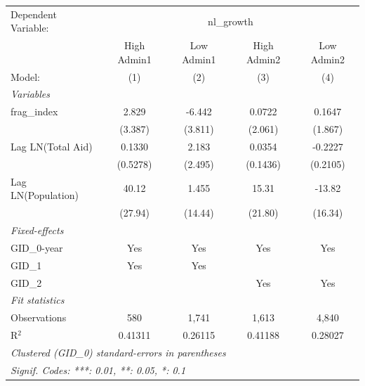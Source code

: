 
\begingroup
\centering
\begin{tabular}{lcccc}
   \tabularnewline \midrule \midrule
   Dependent Variable: & \multicolumn{4}{c}{nl\_growth}\\
                      & High Admin1 & Low Admin1 & High Admin2 & Low Admin2 \\   
   Model:             & (1)         & (2)        & (3)         & (4)\\  
   \midrule
   \emph{Variables}\\
   frag\_index        & 2.829       & -6.442     & 0.0722      & 0.1647\\   
                      & (3.387)     & (3.811)    & (2.061)     & (1.867)\\   
   Lag LN(Total Aid)  & 0.1330      & 2.183      & 0.0354      & -0.2227\\   
                      & (0.5278)    & (2.495)    & (0.1436)    & (0.2105)\\   
   Lag LN(Population) & 40.12       & 1.455      & 15.31       & -13.82\\   
                      & (27.94)     & (14.44)    & (21.80)     & (16.34)\\   
   \midrule
   \emph{Fixed-effects}\\
   GID\_0-year        & Yes         & Yes        & Yes         & Yes\\  
   GID\_1             & Yes         & Yes        &             & \\  
   GID\_2             &             &            & Yes         & Yes\\  
   \midrule
   \emph{Fit statistics}\\
   Observations       & 580         & 1,741      & 1,613       & 4,840\\  
   R$^2$              & 0.41311     & 0.26115    & 0.41188     & 0.28027\\  
   \midrule \midrule
   \multicolumn{5}{l}{\emph{Clustered (GID\_0) standard-errors in parentheses}}\\
   \multicolumn{5}{l}{\emph{Signif. Codes: ***: 0.01, **: 0.05, *: 0.1}}\\
\end{tabular}
\par\endgroup



